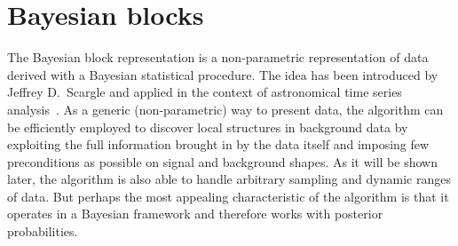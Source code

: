 
\chapter{Bayesian blocks}%
\label{apdx:bayesblocks}

The Bayesian block representation is a non-parametric representation of data derived with
a Bayesian statistical procedure. The idea has been introduced by Jeffrey D.~Scargle and
applied in the context of astronomical time series analysis~\cite{Scargle1997,
Scargle2012}. As a generic (non-parametric) way to present data, the algorithm can be
efficiently employed to discover local structures in background data by exploiting the
full information brought in by the data itself and imposing few preconditions as possible
on signal and background shapes. As it will be shown later, the algorithm is also able to
handle arbitrary sampling and dynamic ranges of data. But perhaps the most appealing characteristic of the
algorithm is that it operates in a Bayesian framework and therefore works with posterior
probabilities.

